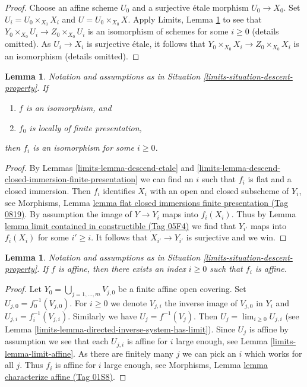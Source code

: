 \documentclass{amsart}
\theoremstyle{plain}
\newtheorem{lemma}[subsection]{Lemma}
\theoremstyle{definition}
\theoremstyle{remark}
\numberwithin{equation}{subsection}
\def\lim{\mathop{\mathrm{lim}}\nolimits}
\begin{document}
\begin{proof}
Choose an affine scheme $U_0$ and a surjective \'etale morphism $U_0 \to X_0$.
Set $U_i = U_0 \times_{X_0} X_i$ and $U = U_0 \times_{X_0} X$.
Apply Limits, Lemma \ref{limits-lemma-descend-isomorphism}
to see that $Y_0 \times_{X_0} U_i \to Z_0 \times_{X_0} U_i$
is an isomorphism of schemes for some $i \geq 0$ (details omitted).
As $U_i \to X_i$ is surjective \'etale, it follows that
$Y_0 \times_{X_0} X_i \to Z_0 \times_{X_0} X_i$ is an isomorphism
(details omitted).
\end{proof}


\begin{lemma}
\label{limits-lemma-descend-isomorphism}
Notation and assumptions as in Situation \ref{limits-situation-descent-property}.
If
\begin{enumerate}
\item $f$ is an isomorphism, and
\item $f_0$ is locally of finite presentation,
\end{enumerate}
then $f_i$ is an isomorphism for some $i \geq 0$.
\end{lemma}

\begin{proof}
By Lemmas \ref{limits-lemma-descend-etale} and
\ref{limits-lemma-descend-closed-immersion-finite-presentation}
we can find an $i$ such that $f_i$ is flat and a closed immersion.
Then $f_i$ identifies $X_i$ with an open and closed subscheme of
$Y_i$, see Morphisms, Lemma
\href{https://stacks.math.columbia.edu/tag/0819}{lemma flat closed immersions finite presentation (Tag 0819)}.
By assumption the image of $Y \to Y_i$ maps into $f_i(X_i)$.
Thus by Lemma \href{https://stacks.math.columbia.edu/tag/05F4}{lemma limit contained in constructible (Tag 05F4)}
we find that $Y_{i'}$ maps into $f_i(X_i)$ for some $i' \geq i$.
It follows that $X_{i'} \to Y_{i'}$ is surjective and we win.
\end{proof}


\begin{lemma}
\label{limits-lemma-descend-affine-finite-presentation}
Notation and assumptions as in Situation \ref{limits-situation-descent-property}.
If $f$ is affine, then there exists an index $i \geq 0$
such that $f_i$ is affine.
\end{lemma}

\begin{proof}
Let $Y_0 = \bigcup_{j = 1, \ldots, m} V_{j, 0}$ be a finite affine
open covering. Set $U_{j, 0} = f_0^{-1}(V_{j, 0})$. For $i \geq 0$
we denote $V_{j, i}$ the inverse image of $V_{j, 0}$ in $Y_i$ and
$U_{j, i} = f_i^{-1}(V_{j, i})$. Similarly we have
$U_j = f^{-1}(V_j)$. Then $U_j = \lim_{i \geq 0} U_{j, i}$
(see Lemma \ref{limits-lemma-directed-inverse-system-has-limit}).
Since $U_j$ is affine by assumption we see that
each $U_{j, i}$ is affine for $i$ large enough, see
Lemma \ref{limits-lemma-limit-affine}. As there are finitely many $j$ we
can pick an $i$ which works for all $j$. Thus $f_i$ is
affine for $i$ large enough, see
Morphisms, Lemma \href{https://stacks.math.columbia.edu/tag/01S8}{lemma characterize affine (Tag 01S8)}.
\end{proof}
\end{document}
